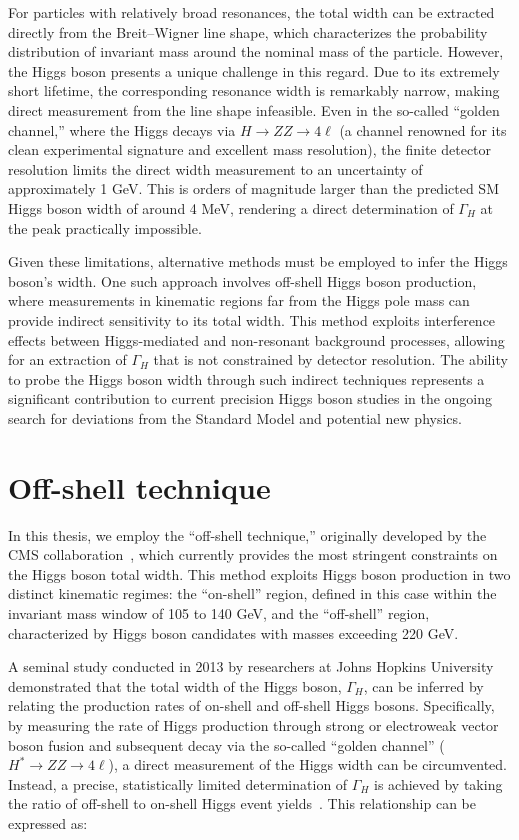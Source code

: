 For particles with relatively broad resonances, the total width can be extracted directly from the Breit–Wigner line shape, which characterizes the probability distribution of invariant mass around the nominal mass of the particle. However, the Higgs boson presents a unique challenge in this regard. Due to its extremely short lifetime, the corresponding resonance width is remarkably narrow, making direct measurement from the line shape infeasible. Even in the so-called ``golden channel,'' where the Higgs decays via \( H \to ZZ \to 4\ell \) (a channel renowned for its clean experimental signature and excellent mass resolution), the finite detector resolution limits the direct width measurement to an uncertainty of approximately 1 GeV. This is orders of magnitude larger than the predicted SM Higgs boson width of around 4 MeV, rendering a direct determination of \( \Gamma_H \) at the peak practically impossible.

Given these limitations, alternative methods must be employed to infer the Higgs boson's width. One such approach involves off-shell Higgs boson production, where measurements in kinematic regions far from the Higgs pole mass can provide indirect sensitivity to its total width. This method exploits interference effects between Higgs-mediated and non-resonant background processes, allowing for an extraction of \( \Gamma_H \) that is not constrained by detector resolution. The ability to probe the Higgs boson width through such indirect techniques represents a significant contribution to current precision Higgs boson studies in the ongoing search for deviations from the Standard Model and potential new physics.

\section{Off-shell technique}

In this thesis, we employ the ``off-shell technique,'' originally developed by the CMS collaboration~\cite{1405345570}, which currently provides the most stringent constraints on the Higgs boson total width. This method exploits Higgs boson production in two distinct kinematic regimes: the ``on-shell'' region, defined in this case within the invariant mass window of 105 to 140 GeV, and the ``off-shell'' region, characterized by Higgs boson candidates with masses exceeding 220 GeV.

A seminal study conducted in 2013 by researchers at Johns Hopkins University~\cite{13074935} demonstrated that the total width of the Higgs boson, \( \Gamma_H \), can be inferred by relating the production rates of on-shell and off-shell Higgs bosons. Specifically, by measuring the rate of Higgs production through strong or electroweak vector boson fusion and subsequent decay via the so-called ``golden channel'' (\( H^* \to ZZ \to 4\ell \)), a direct measurement of the Higgs width can be circumvented. Instead, a precise, statistically limited determination of \( \Gamma_H \) is achieved by taking the ratio of off-shell to on-shell Higgs event yields~\cite{190100174}. This relationship can be expressed as:

